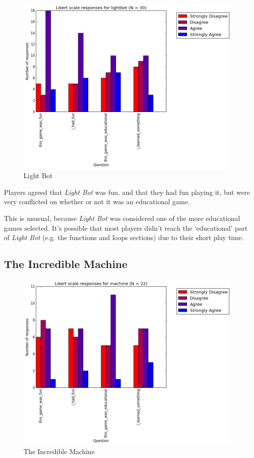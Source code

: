 				\begin{figure}[] 
				\centering 
				\includegraphics[width=\textwidth, height=.4\textheight, keepaspectratio=true]{lightbot_likert.png} 
				\caption{Light Bot}
				\end{figure}

				Players agreed that \textit{Light Bot} was fun, and that they had fun playing it, but were very conflicted on whether or not it was an educational game. 

				This is unusual, because \textit{Light Bot} was considered one of the more educational games selected. It's possible that most players didn't reach the `educational' part of \textit{Light Bot} (e.g. the functions and loops sections) due to their short play time.

			\subsection{The Incredible Machine}

				\begin{figure}[] 
				\centering 
				\includegraphics[width=\textwidth, height=.4\textheight, keepaspectratio=true]{machine_likert.png} 
				\caption{The Incredible Machine}
				\end{figure}


